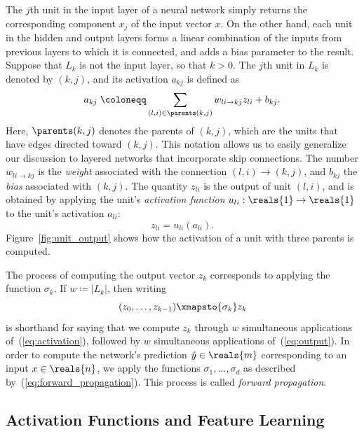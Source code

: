 \documentclass[11pt,a4paper]{article}
\numberwithin{equation}{section}
\newcommand{\weight}[2]{w_{#1 \rightarrow #2}}
\begin{document}
The $j$th unit in the input layer of a neural network simply returns the
corresponding component $x_j$ of the input vector $x$. On the other hand, each
unit in the hidden and output layers forms a linear combination of the inputs
from previous layers to which it is connected, and adds a bias parameter to the
result. Suppose that $L_k$ is not the input layer, so that $k > 0$. The $j$th
unit in $L_k$ is denoted by $(k, j)$, and its activation $a_{kj}$ is defined as
\begin{equation}
	a_{kj} \;\coloneqq \sum_{(l, i) \in \parents(k, j)} \weight{li}{kj} z_{li} + b_{kj}.
	\label{eq:activation}
\end{equation}
Here, $\parents(k, j)$ denotes the parents of $(k, j)$, which are the units that
have edges directed toward $(k, j)$. This notation allows us to easily
generalize our discussion to layered networks that incorporate skip connections.
The number $\weight{li}{kj}$ is the \emph{weight} associated with the connection
$(l, i) \rightarrow (k, j)$, and $b_{kj}$ the \emph{bias} associated with $(k,
j)$. The quantity $z_{li}$ is the output of unit $(l, i)$, and is obtained by
applying the unit's \emph{activation function} $u_{li} : \reals{1} \to
\reals{1}$ to the unit's activation $a_{li}$:
\begin{equation}
	z_{li} = u_{li}(a_{li}).
	\label{eq:output}
\end{equation}
Figure~\ref{fig:unit_output} shows how the activation of a unit with three
parents is computed.

The process of computing the output vector $z_k$ corresponds to applying the
function $\sigma_k$. If $w \coloneqq |L_k|$, then writing
\[
	(z_0, \ldots, z_{k - 1}) \xmapsto{\sigma_k} z_k
\]
is shorthand for saying that we compute $z_k$ through $w$ simultaneous
applications of~(\ref{eq:activation}), followed by $w$ simultaneous
applications of~(\ref{eq:output}). In order to compute the network's
prediction $\hat{y} \in \reals{m}$ corresponding to an input $x \in \reals{n}$,
we apply the functions $\sigma_1, \ldots, \sigma_d$ as described
by~(\ref{eq:forward_propagation}). This process is called \emph{forward
propagation}.

\subsection{Activation Functions and Feature Learning}
\label{sec:act_func_and_feature_learning}
\end{document}
